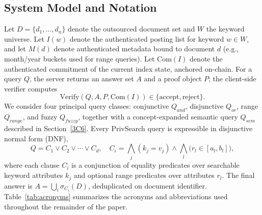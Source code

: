 \subsection{System Model and Notation}
\label{3B}
Let $D=\{d_1,\dots,d_n\}$ denote the outsourced document set and $W$ the keyword universe. Let $I(w)$ denote the authenticated posting list for keyword $w \in W$, and let $M(d)$ denote authenticated metadata bound to document $d$ (e.g., month/year buckets used for range queries). Let $\mathrm{Com}(I)$ denote the authenticated commitment of the current index state, anchored on-chain. For a query $Q$, the server returns an answer set $A$ and a proof object $P$; the client-side verifier computes
\begin{equation}
\mathrm{Verify}(Q,A,P,\mathrm{Com}(I)) \in \{\text{accept}, \text{reject}\}.
\end{equation}
We consider four principal query classes: conjunctive $Q_{and}$, disjunctive $Q_{or}$, range $Q_{range}$, and fuzzy $Q_{fuzzy}$, together with a concept-expanded semantic query $Q_{sem}$ described in Section~\ref{3C6}. Every PrivSearch query is expressible in disjunctive normal form (DNF),
\begin{equation}
Q = C_1 \lor C_2 \lor \cdots \lor C_d, \quad
C_i = \bigwedge_{j} (k_j = v_j) \wedge \bigwedge_{l} \big(r_l \in [a_l,b_l]\big),
\label{eq:dnf}
\end{equation}
where each clause $C_i$ is a conjunction of equality predicates over searchable keyword attributes $k_j$ and optional range predicates over attributes $r_l$. The final answer is $A = \bigcup_i \sigma_{C_i}(D)$, deduplicated on document identifier. Table~\ref{tab:acronyms} summarizes the acronyms and abbreviations used throughout the remainder of the paper.
